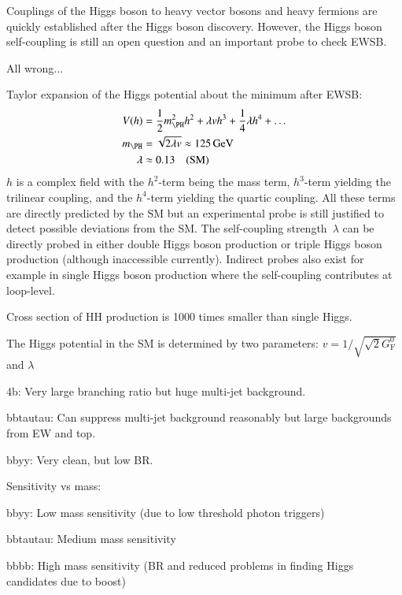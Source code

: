 Couplings of the Higgs boson to heavy vector bosons and heavy fermions
are quickly established after the Higgs boson discovery. However, the
Higgs boson self-coupling is still an open question and an important
probe to check EWSB.


All wrong...

Taylor expansion of the Higgs potential about the minimum after EWSB:
\begin{align*}
  V(h) &= \frac{1}{2} m_{\PH}^2 h^2 + \lambda v h^3 + \frac{1}{4} \lambda h^4 + \dots \\
  m_{\PH} &= \sqrt{2 \lambda v} \approx \SI{125}{\GeV} \\
  \lambda &\approx 0.13 \quad \text{(SM)}
\end{align*}
$h$ is a complex field with the $h^2$-term being the mass term,
$h^3$-term yielding the trilinear coupling, and the $h^4$-term
yielding the quartic coupling. All these terms are directly predicted
by the SM but an experimental probe is still justified to detect
possible deviations from the SM. The self-coupling strength~$\lambda$
can be directly probed in either double Higgs boson production or
triple Higgs boson production (although inaccessible
currently). Indirect probes also exist for example in single Higgs
boson production where the self-coupling contributes at loop-level.

Cross section of HH production is 1000 times smaller than single
Higgs. 

The Higgs potential in the SM is determined by two parameters:
$v = 1 / \sqrt{\sqrt{2} G_{\text{F}}^0}$ and $\lambda$



4b: Very large branching ratio but huge multi-jet background.

bbtautau: Can suppress multi-jet background reasonably but large
backgrounds from EW and top.

bbyy: Very clean, but low BR.

Sensitivity vs mass:

bbyy: Low mass sensitivity (due to low threshold photon triggers)

bbtautau: Medium mass sensitivity

bbbb: High mass sensitivity (BR and reduced problems in finding Higgs
candidates due to boost)

